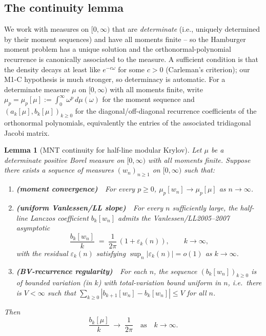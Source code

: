\documentclass[11pt]{article}
\newtheorem{lemma}[theorem]{Lemma}
\theoremstyle{definition}
\begin{document}
\subsection{The continuity lemma}\label{sec:MNTlemma}

We work with measures on $[0,\infty)$ that are \emph{determinate}
(i.e., uniquely determined by their moment sequences) and have all
moments finite -- so the Hamburger moment problem has a unique
solution and the orthonormal-polynomial recurrence is canonically
associated to the measure.  A sufficient condition is that the
density decays at least like $e^{-c\omega}$ for some $c>0$
(Carleman's criterion); our M1-C hypothesis is much stronger, so
determinacy is automatic.  For a determinate measure $\mu$ on
$[0,\infty)$ with all moments finite, write $\mu_p = \mu_p[\mu] :=
\int_0^\infty \omega^p\,d\mu(\omega)$ for the moment sequence and
$(a_k[\mu], b_k[\mu])_{k\ge 0}$ for the diagonal/off-diagonal
recurrence coefficients of the orthonormal polynomials, equivalently
the entries of the associated tridiagonal Jacobi matrix.

\begin{lemma}[MNT continuity for half-line modular Krylov]\label{lem:MNT}
Let $\mu$ be a determinate positive Borel measure on $[0,\infty)$ with
all moments finite.  Suppose there exists a sequence of measures
$(w_n)_{n\ge 1}$ on $[0,\infty)$ such that:
\begin{enumerate}[label=(\textit{C\arabic*}),leftmargin=*]
\item\label{C1}\textbf{(moment convergence)}~~For every $p\ge 0$,
$\mu_p[w_n]\to\mu_p[\mu]$ as $n\to\infty$.
\item\label{C2}\textbf{(uniform Vanlessen/LL slope)}~~For every $n$
sufficiently large, the half-line Lanczos coefficient $b_k[w_n]$
admits the Vanlessen/LL2005--2007 asymptotic
\begin{equation}\label{eq:ll-asymp}
\frac{b_k[w_n]}{k}\;=\;\frac{1}{2\pi}\,(1+\varepsilon_k(n)),
\qquad k\to\infty,
\end{equation}
with the residual $\varepsilon_k(n)$ satisfying
$\sup_n |\varepsilon_k(n)| = o(1)$ as $k\to\infty$.
\item\label{C3}\textbf{(BV-recurrence regularity)}~~For each $n$, the
sequence $(b_k[w_n])_{k\ge 0}$ is of bounded variation (in $k$) with
total-variation bound uniform in $n$, i.e.\ there is $V<\infty$ such
that $\sum_{k\ge 0} |b_{k+1}[w_n]-b_k[w_n]|\le V$ for all $n$.
\end{enumerate}
Then
\begin{equation}\label{eq:MNT-conclusion}
\frac{b_k[\mu]}{k}\;\longrightarrow\;\frac{1}{2\pi}\quad\text{as}\quad k\to\infty.
\end{equation}
\end{lemma}
\end{document}
